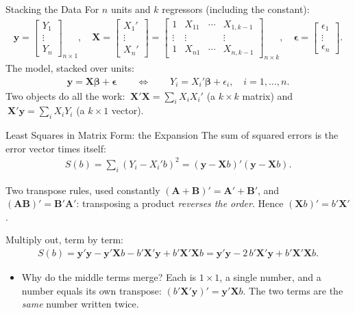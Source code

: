 \documentclass[aspectratio=169,11pt,xcolor=dvipsnames]{beamer}
\newcommand{\X}{\bm{X}}
\newcommand{\Y}{\bm{y}}
\begin{document}
\begin{frame}{Stacking the Data}
For $n$ units and $k$ regressors (including the constant):
\begin{align*}
  \Y = \begin{bmatrix} Y_1 \\ \vdots \\ Y_n \end{bmatrix}_{n\times 1},
  \quad
  \X = \begin{bmatrix} X_1' \\ \vdots \\ X_n' \end{bmatrix}
     = \begin{bmatrix}
        1 & X_{11} & \cdots & X_{1,k-1}\\
        \vdots & \vdots & & \vdots \\
        1 & X_{n1} & \cdots & X_{n,k-1}
       \end{bmatrix}_{n\times k},
  \quad
  \bm\epsilon = \begin{bmatrix} \epsilon_1 \\ \vdots \\ \epsilon_n\end{bmatrix}.
\end{align*}
The model, stacked over units:
\begin{align*}
  \Y = \X\bm\beta + \bm\epsilon
  \qquad\Longleftrightarrow\qquad
  Y_i = X_i'\bm\beta + \epsilon_i,\quad i=1,\dots,n .
\end{align*}
Two objects do all the work:
$\ \X'\X = \sum_i X_iX_i'$ (a $k\times k$ matrix) and
$\ \X'\Y = \sum_i X_i Y_i$ (a $k\times 1$ vector).
\end{frame}

\begin{frame}{Least Squares in Matrix Form: the Expansion}
The sum of squared errors is the error vector times itself:
\begin{align*}
  S(b) = \sum_{i} (Y_i - X_i'b)^2 = (\Y-\X b)'(\Y-\X b) .
\end{align*}
\begin{block}{Two transpose rules, used constantly}
$(\bm A + \bm B)' = \bm A' + \bm B'$, and $(\bm A\bm B)' = \bm B'\bm A'$:
transposing a product \emph{reverses the order}. Hence $(\X b)' = b'\X'$.
\end{block}
Multiply out, term by term:
\begin{align*}
  S(b) = \Y'\Y - \Y'\X b - b'\X'\Y + b'\X'\X b
       = \Y'\Y - 2\,b'\X'\Y + b'\X'\X b .
\end{align*}
\vskip-2pt
\begin{itemize}\itemsep2pt
  \item Why do the middle terms merge? Each is $1\times1$, a single number,
        and a number equals its own transpose: $(b'\X'\Y)' = \Y'\X b$. The two
        terms are the \emph{same} number written twice.
\end{itemize}
\end{frame}
\end{document}
